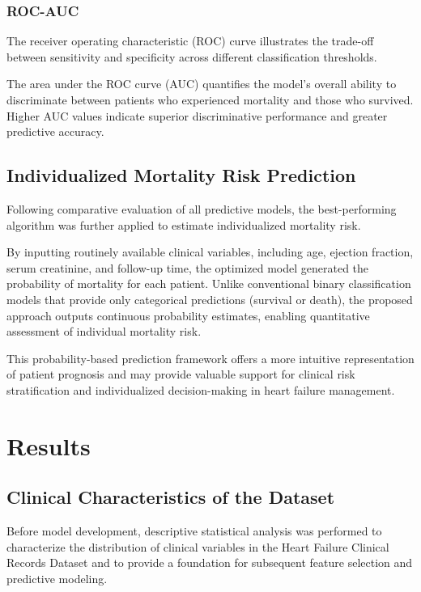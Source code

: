 \documentclass[12pt]{article}
\begin{document}
\subsubsection{ROC-AUC}

The receiver operating characteristic (ROC) curve illustrates the trade-off between sensitivity and specificity across different classification thresholds.

The area under the ROC curve (AUC) quantifies the model's overall ability to discriminate between patients who experienced mortality and those who survived. Higher AUC values indicate superior discriminative performance and greater predictive accuracy. 

\subsection{Individualized Mortality Risk Prediction}

Following comparative evaluation of all predictive models, the best-performing algorithm was further applied to estimate individualized mortality risk.

By inputting routinely available clinical variables, including age, ejection fraction, serum creatinine, and follow-up time, the optimized model generated the probability of mortality for each patient. Unlike conventional binary classification models that provide only categorical predictions (survival or death), the proposed approach outputs continuous probability estimates, enabling quantitative assessment of individual mortality risk.

This probability-based prediction framework offers a more intuitive representation of patient prognosis and may provide valuable support for clinical risk stratification and individualized decision-making in heart failure management.

\section{Results}

\subsection{Clinical Characteristics of the Dataset}

Before model development, descriptive statistical analysis was performed to characterize the distribution of clinical variables in the Heart Failure Clinical Records Dataset and to provide a foundation for subsequent feature selection and predictive modeling.
\end{document}
